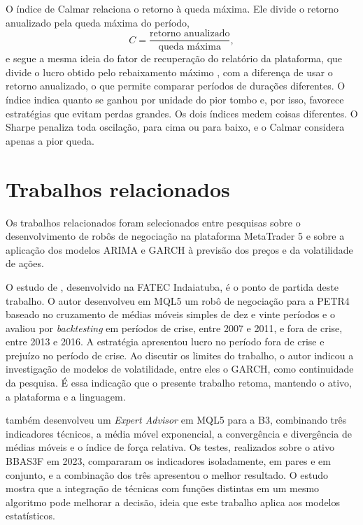O índice de Calmar relaciona o retorno à queda máxima. Ele divide o retorno
anualizado pela queda máxima do período,
\begin{equation*}
C = \frac{\text{retorno anualizado}}{\text{queda máxima}},
\end{equation*}
e segue a mesma ideia do fator de recuperação do relatório da plataforma, que
divide o lucro obtido pelo rebaixamento máximo \cite{metaquotesRelatorio}, com a
diferença de usar o retorno anualizado, o que permite comparar períodos de
durações diferentes. O índice indica quanto se ganhou por unidade do pior tombo e,
por isso, favorece estratégias que evitam perdas grandes. Os dois índices medem
coisas diferentes. O Sharpe penaliza toda oscilação, para cima ou para baixo, e o
Calmar considera apenas a pior queda.

\section{Trabalhos relacionados}

Os trabalhos relacionados foram selecionados entre pesquisas sobre o
desenvolvimento de robôs de negociação na plataforma MetaTrader 5 e sobre a
aplicação dos modelos ARIMA e GARCH à previsão dos preços e da volatilidade de ações.

O estudo de , desenvolvido na FATEC Indaiatuba, é o ponto
de partida deste trabalho. O autor desenvolveu em MQL5 um robô de negociação para
a PETR4 baseado no cruzamento de médias móveis simples de dez e vinte períodos e o
avaliou por \textit{backtesting} em períodos de crise, entre 2007 e 2011, e fora
de crise, entre 2013 e 2016. A estratégia apresentou lucro no período fora de
crise e prejuízo no período de crise. Ao discutir os limites do
trabalho, o autor indicou a investigação de modelos de volatilidade, entre eles o
GARCH, como continuidade da pesquisa. É essa indicação que o presente trabalho
retoma, mantendo o ativo, a plataforma e a linguagem.

 também desenvolveu um \textit{Expert Advisor} em MQL5
para a B3, combinando três indicadores técnicos, a média móvel exponencial, a
convergência e divergência de médias móveis e o índice de força relativa. Os testes,
realizados sobre o ativo BBAS3F em 2023, compararam os indicadores isoladamente,
em pares e em conjunto, e a combinação dos três apresentou o melhor resultado. O
estudo mostra que a integração de técnicas com funções distintas em um mesmo
algoritmo pode melhorar a decisão, ideia que este trabalho aplica aos modelos
estatísticos.

